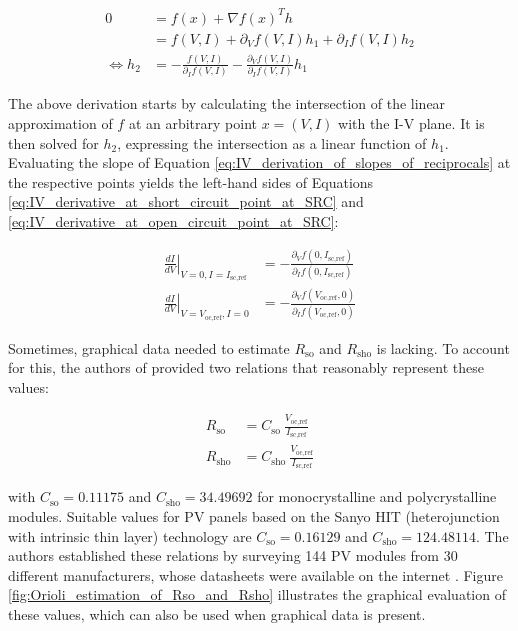 \begin{align}
    0 &= f(x) + \nabla f(x)^Th \nonumber \\
      &= f(V,I) + \partial_{V}f(V,I)h_{1} + \partial_{I}f(V,I)h_{2} \nonumber \\
    \Leftrightarrow h_2 &= -\frac{f(V,I)}{\partial_{I}f(V,I)} - \frac{\partial_{V}f(V,I)}{\partial_{I}f(V,I)}h_{1}
    \label{eq:IV_derivation_of_slopes_of_reciprocals}
\end{align}

\noindent
The above derivation starts by calculating the intersection of the linear approximation
of \(f\) at an arbitrary point \(x = (V, I)\) with the I-V plane. It is then
solved for \(h_{2}\), expressing the intersection as a linear function of \(h_{1}\).
Evaluating the slope of Equation \ref{eq:IV_derivation_of_slopes_of_reciprocals} at
the respective points yields the left-hand sides of Equations
\ref{eq:IV_derivative_at_short_circuit_point_at_SRC} and \ref{eq:IV_derivative_at_open_circuit_point_at_SRC}:

\begin{align}
    \left.\frac{dI}{dV}\right|_{V = 0, I = I_{\text{sc,ref}}} &= - \frac{\partial_{V}f(0,I_{\text{sc,ref}})}{\partial_{I}f(0,I_{\text{sc,ref}})} \\
    \left.\frac{dI}{dV}\right|_{ V = V_{\text{oc,ref}}, I = 0} &= - \frac{\partial_{V}f(V_{\text{oc,ref}},0)}{\partial_{I}f(V_{\text{oc,ref}},0)}
\end{align}

Sometimes, graphical data needed to estimate \(R_{\text{so}}\) and \(R_{\text{sho}}\) is
lacking. To account for this, the authors of \cite{Orioli} provided two relations
that reasonably represent these values:

\begin{align}
    R_{\text{so}} &= C_{\text{so}} \: \frac{V_{\text{oc,ref}}}{I_{\text{sc,ref}}}
    \label{eq:Estimation_of_Rso} \\
    R_{\text{sho}} &= C_{\text{sho}} \: \frac{V_{\text{oc,ref}}}{I_{\text{sc,ref}}}
    \label{eq:Estimation_of_Rsho}
\end{align}

\noindent
with \(C_{\text{so}} = 0.11175\) and \(C_{\text{sho}} = 34.49692\) for monocrystalline and polycrystalline
modules. Suitable values for PV panels based on the Sanyo HIT (heterojunction with intrinsic
thin layer) technology are \(C_{\text{so}} = 0.16129\) and \(C_{\text{sho}} = 124.48114\). The authors
established these relations by surveying 144 PV modules from 30 different manufacturers,
whose datasheets were available on the internet \cite[p. 1164]{Orioli}. Figure
\ref{fig:Orioli_estimation_of_Rso_and_Rsho} illustrates the graphical evaluation
of these values, which can also be used when graphical data is present.

